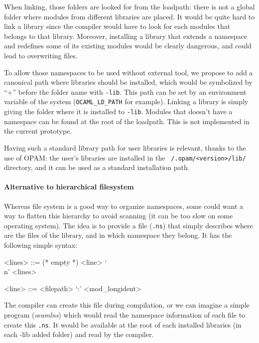 When linking, those folders are looked for from the loadpath: there is not a
global folder where modules from different libraries are placed. It would be
quite hard to link a library since the compiler would have to look for each
modules that belongs to that library. Moreover, installing a library that
extends a namespace and redefines some of its existing modules would be clearly
dangerous, and could lead to overwriting files.

To allow those namespaces to be used without external tool, we propose to add a
canonical path where libraries should be installed, which would be symbolized by
``+'' before the folder name with \texttt{-lib}. This path can be set by an
environment variable of the system (\texttt{OCAML\_LD\_PATH} for
example). Linking a library is simply giving the folder where it is installed to
\texttt{-lib}. Modules that doesn't have a namespace can be found at the root of
the loadpath. This is not implemented in the current prototype.

Having such a standard library path for user libraries is relevant, thanks to
the use of OPAM: the user's libraries are installed in the
\texttt{~/.opam/<version>/lib/} directory, and it can be used as a standard
installation path. 

\paragraph{Alternative to hierarchical filesystem}

Whereas file system is a good way to organize namespaces, some could want a way
to flatten this hierarchy to avoid scanning (it can be too slow on some
operating system). The idea is to provide a file (\texttt{.ns}) that simply
describes where are the files of the library, and in which namespace they
belong. It has the following simple syntax:

\begin{grammar}
<lines> ::= (* empty *)
<line> `\\n' <lines>

<line> ::= <filepath> `:' <mod_longident>
\end{grammar}

The compiler can create this file during compilation, or we can imagine a simple
program (\emph{ocamlns}) which would read the namespace information of each file
to create this \texttt{.ns}. It would be available at the root of each installed
libraries (in each -lib added folder) and read by the compiler.


